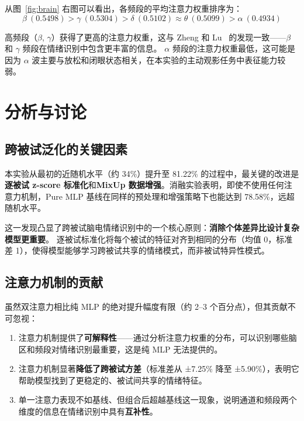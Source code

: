 \documentclass[12pt,a4paper]{ctexart}
\begin{document}
从图~\ref{fig:brain} 右图可以看出，各频段的平均注意力权重排序为：
\begin{equation}
    \beta\ (0.5498) > \gamma\ (0.5304) > \delta\ (0.5102) \approx \theta\ (0.5099) > \alpha\ (0.4934)
\end{equation}

高频段（$\beta$, $\gamma$）获得了更高的注意力权重，这与 Zheng 和 Lu~\cite{zheng2015} 的发现一致——$\beta$ 和 $\gamma$ 频段在情绪识别中包含更丰富的信息。
$\alpha$ 频段的注意力权重最低，这可能是因为 $\alpha$ 波主要与放松和闭眼状态相关，在本实验的主动观影任务中表征能力较弱。


\section{分析与讨论}

\subsection{跨被试泛化的关键因素}

本实验从最初的近随机水平（约 34\%）提升至 81.22\% 的过程中，最关键的改进是\textbf{逐被试 z-score 标准化}和\textbf{MixUp 数据增强}。消融实验表明，即使不使用任何注意力机制，Pure MLP 基线在同样的预处理和增强策略下也能达到 78.58\%，远超随机水平。

这一发现凸显了跨被试脑电情绪识别中的一个核心原则：\textbf{消除个体差异比设计复杂模型更重要}。
逐被试标准化将每个被试的特征对齐到相同的分布（均值 0，标准差 1），使得模型能够学习跨被试共享的情绪模式，而非被试特异性模式。

\subsection{注意力机制的贡献}

虽然双注意力相比纯 MLP 的绝对提升幅度有限（约 2--3 个百分点），但其贡献不可忽视：
\begin{enumerate}[itemsep=0pt]
    \item 注意力机制提供了\textbf{可解释性}——通过分析注意力权重的分布，可以识别哪些脑区和频段对情绪识别最重要，这是纯 MLP 无法提供的。
    \item 注意力机制显著\textbf{降低了跨被试方差}（标准差从 ±7.25\% 降至 ±5.90\%），表明它帮助模型找到了更稳定的、被试间共享的情绪特征。
    \item 单一注意力表现不如基线、但组合后超越基线这一现象，说明通道和频段两个维度的信息在情绪识别中具有\textbf{互补性}。
\end{enumerate}
\end{document}
